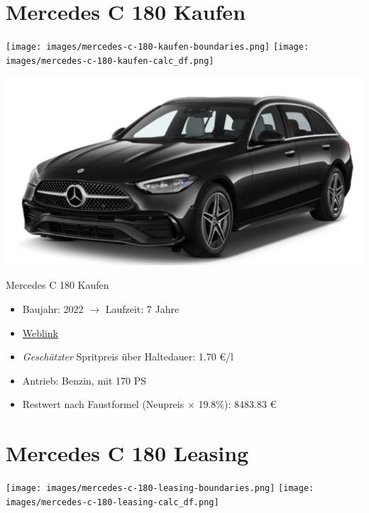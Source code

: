 \documentclass[landscape, DIV=99, 14pt]{scrartcl}
\begin{document}
\section*{Mercedes C 180 Kaufen}
\begin{center}
\texttt{[image: images/mercedes-c-180-kaufen-boundaries.png]}
\null
\vspace{0.5cm}
\texttt{[image: images/mercedes-c-180-kaufen-calc\_df.png]}
\end{center}

\pagebreak
\null
\vspace{2cm}
\begin{center}
\includegraphics[width=0.9\columnwidth]{cars/mercedes-c-180-t.png}

Mercedes C 180 Kaufen
\end{center}

\begin{itemize}
    \item Baujahr: 2022 $\rightarrow$ Laufzeit: 7 Jahre
    \item \href{https://konfigurator.meinauto.de/mercedes/neuwagen/c-klasse/angebote/c-klasse-t-modell/konfigurator/\#!/preisvergleich/-/8866563/2,47,74,81/private/43735-7309-290394/349/61d36ce4c3067/cash-purchase/73169--190162/48,0,10000,0,0,0,0,0,}{Weblink}
    \item \emph{Gesch\"atzter} Spritpreis \"uber Haltedauer: 1.70 \euro{}/l
    \item Antrieb: Benzin, mit 170 PS
    \item Restwert nach Faustformel (Neupreis $\times$ 19.8\%): 8483.83 \euro{}
\end{itemize}

\pagebreak


\twocolumn

\section*{Mercedes C 180 Leasing}
\begin{center}
\texttt{[image: images/mercedes-c-180-leasing-boundaries.png]}
\null
\vspace{0.5cm}
\texttt{[image: images/mercedes-c-180-leasing-calc\_df.png]}
\end{center}
\end{document}
